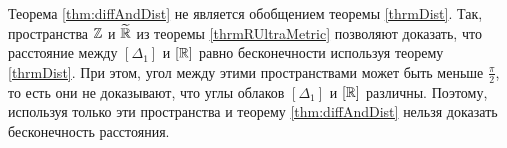 \begin{remark}
  Теорема \ref{thm:diffAndDist} не является обобщением теоремы
  \ref{thrmDist}. Так, пространства \( {\mathbb Z} \) и \( \widetilde {\mathbb R} \) из
  теоремы \ref{thrmRUltraMetric} позволяют доказать, что расстояние
  между \( [\Delta _1] \) и \( [\mathbb R] \) равно бесконечности
  используя теорему  \ref{thrmDist}. При этом, угол между этими
  пространствами может быть меньше \( \frac \pi 2 \), то есть они не
  доказывают, что углы облаков \( [\Delta _1] \) и \( [\mathbb R] \) различны. Поэтому,
  используя только эти пространства и теорему  \ref{thm:diffAndDist}
  нельзя доказать бесконечность расстояния.

\end{remark}
